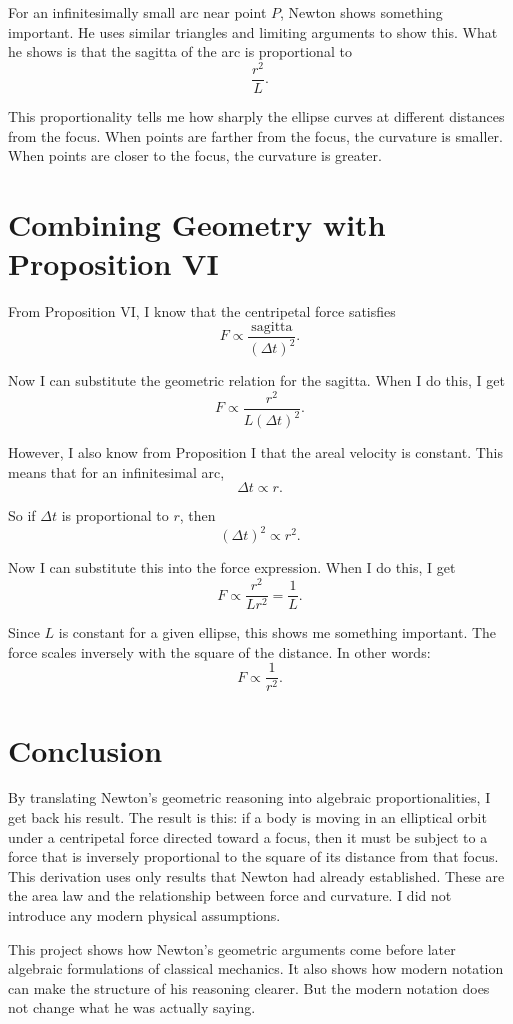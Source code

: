 \documentclass[12pt]{article}
\begin{document}
For an infinitesimally small arc near point $P$, Newton shows something important. He uses similar triangles and limiting arguments to show this. What he shows is that the sagitta of the arc is proportional to
\[
\frac{r^{2}}{L}.
\]

This proportionality tells me how sharply the ellipse curves at different distances from the focus. When points are farther from the focus, the curvature is smaller. When points are closer to the focus, the curvature is greater.

\section*{Combining Geometry with Proposition VI}

From Proposition VI, I know that the centripetal force satisfies
\[
F \propto \frac{\text{sagitta}}{(\Delta t)^2}.
\]

Now I can substitute the geometric relation for the sagitta. When I do this, I get
\[
F \propto \frac{r^{2}}{L(\Delta t)^2}.
\]

However, I also know from Proposition I that the areal velocity is constant. This means that for an infinitesimal arc,
\[
\Delta t \propto r.
\]

So if $\Delta t$ is proportional to $r$, then
\[
(\Delta t)^2 \propto r^2.
\]

Now I can substitute this into the force expression. When I do this, I get
\[
F \propto \frac{r^{2}}{L r^{2}} = \frac{1}{L}.
\]

Since $L$ is constant for a given ellipse, this shows me something important. The force scales inversely with the square of the distance. In other words:
\[
F \propto \frac{1}{r^2}.
\]

\section*{Conclusion}

By translating Newton's geometric reasoning into algebraic proportionalities, I get back his result. The result is this: if a body is moving in an elliptical orbit under a centripetal force directed toward a focus, then it must be subject to a force that is inversely proportional to the square of its distance from that focus. This derivation uses only results that Newton had already established. These are the area law and the relationship between force and curvature. I did not introduce any modern physical assumptions.

This project shows how Newton's geometric arguments come before later algebraic formulations of classical mechanics. It also shows how modern notation can make the structure of his reasoning clearer. But the modern notation does not change what he was actually saying.
\end{document}
